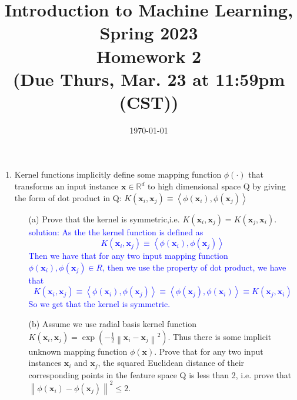 \documentclass[10pt]{article}
\begin{document}
\date{\today}
\title{Introduction to Machine Learning, Spring 2023 \\
	Homework 2\\
	\small (Due Thurs, Mar. 23 at 11:59pm (CST))}
\maketitle
\begin{enumerate}[1.]


\item {}
Kernel functions implicitly define some mapping function  $\phi(\cdot)$  that transforms an input instance  $\mathbf{x} \in \mathbb{R}^{d}$  to high dimensional space  Q  by giving the form of dot product in  Q: $K\left(\mathbf{x}_{i}, \mathbf{x}_{j}\right) \equiv   \left\langle\phi\left(\mathbf{x}_{i}\right), \phi\left(\mathbf{x}_{j}\right)\right\rangle $
\begin{itemize}
    \item[(a)]  Prove that the kernel is symmetric,i.e. $K\left(\mathbf{x}_{i}, \mathbf{x}_{j}\right)=K\left(\mathbf{x}_{j}, \mathbf{x}_{i}\right).$
    \\
    \textcolor{blue}{solution: As the the kernel function is defined as $$K\left(\mathbf{x}_{i}, \mathbf{x}_{j}\right) \equiv   \left\langle\phi\left(\mathbf{x}_{i}\right), \phi\left(\mathbf{x}_{j}\right)\right\rangle $$
    Then we have that for any two input mapping function $\phi\left(\mathbf{x}_{i}\right), \phi\left(\mathbf{x}_{j}\right) \in R$, then we use the property of dot product, we have that $$K\left(\mathbf{x}_{i}, \mathbf{x}_{j}\right)\equiv\left\langle\phi\left(\mathbf{x}_{i}\right), \phi\left(\mathbf{x}_{j}\right)\right\rangle \equiv \left\langle\phi\left(\mathbf{x}_{j}\right), \phi\left(\mathbf{x}_{i}\right)\right\rangle \equiv K\left(\mathbf{x}_{j}, \mathbf{x}_{i}\right)$$
    So we get that the kernel is symmetric.}
 \item[(b)] Assume we use radial basis kernel function  $K\left(\mathbf{x}_{i}, \mathbf{x}_{j}\right)=\exp \left(-\frac{1}{2}\left\|\mathbf{x}_{i}-\mathbf{x}_{j}\right\|^{2}\right)$. Thus there is some implicit unknown mapping function  $\phi(\mathbf{x}) $. Prove that for any two input instances  $\mathbf{x}_{i}$  and  $\mathbf{x}_{j}$, the squared Euclidean distance of their corresponding points in the feature space  Q  is less than 2, i.e. prove that  $\left\|\phi\left(\mathbf{x}_{i}\right)-\phi\left(\mathbf{x}_{j}\right)\right\|^{2} \leq 2$.


\end{itemize}
\end{enumerate}
\end{document}
